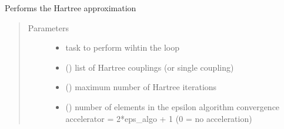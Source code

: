 \documentclass[letterpaper,10pt,english]{sphinxmanual}
\begin{document}
\begin{fulllineitems}
\label{\detokenize{utilities:pyqcm.loop.Hartree}}
\sphinxAtStartPar
Performs the Hartree approximation
\begin{quote}\begin{description}
\item[{Parameters}] \leavevmode\begin{itemize}
\item {} 
\sphinxAtStartPar
{} \textendash{} task to perform wihtin the loop

\item {} 
\sphinxAtStartPar
{} (\sphinxstyleliteralemphasis{\sphinxupquote{{[}}}\sphinxstyleliteralemphasis{\sphinxupquote{{]}}}) \textendash{} list of Hartree couplings (or single coupling)

\item {} 
\sphinxAtStartPar
{} () \textendash{} maximum number of Hartree iterations

\item {} 
\sphinxAtStartPar
{} () \textendash{} number of elements in the epsilon algorithm convergence accelerator = 2*eps\_algo + 1 (0 = no acceleration)

\end{itemize}

\end{description}\end{quote}

\end{fulllineitems}

\end{document}
